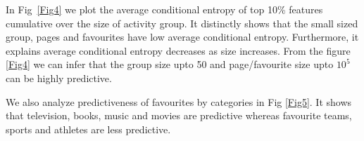 In Fig~\ref{Fig4} we plot the average conditional entropy of top
    10\% features cumulative over the size of activity group. It
    distinctly shows that the small sized group, pages and favourites
    have low average conditional entropy. Furthermore, it explains
    average conditional entropy decreases as size increases. From the
    figure \ref{Fig4} we can infer that the group size upto 50 and
    page/favourite size upto $10^{5}$ can be highly predictive.

We also analyze predictiveness of favourites by categories in
    Fig \ref{Fig5}. It shows that television, books, music and movies
    are predictive whereas favourite teams, sports and athletes are
    less predictive.


